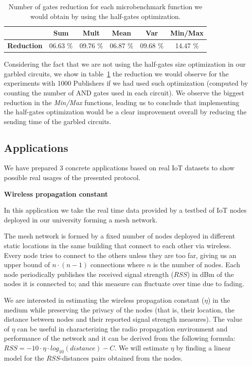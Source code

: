 \begin{table}
    \begin{tabular}{l|*{4}{c}c}
      & \textbf{Sum} & \textbf{Mult} & \textbf{Mean} & \textbf{Var} & \textbf{Min/Max} \\
    \hline
    \textbf{Reduction} & 06.63 \% & 09.76 \% & 06.87 \% & 09.68 \% & 14.47 \% \\
    \end{tabular}
    \caption{Number of gates reduction for each microbenchmark function we
      would obtain by using the half-gates optimization.}
    \label{micro-and}
\end{table}

Considering the fact that we are not using the half-gates size optimization in
our garbled circuits, we show in table~\ref{micro-and} the reduction we would
observe for the experiments with 1000 Publishers if we had used such
optimization (computed by counting the number of AND gates used in each
circuit).  We observe the biggest reduction in the \emph{Min/Max} functions,
leading us to conclude that implementing the half-gates optimization would be a
clear improvement overall by reducing the sending time of the garbled circuits.

\subsection{Applications}

We have prepared 3 concrete applications based on real IoT datasets to show
possible real usages of the presented protocol.

\bigskip
\noindent\textbf{Wireless propagation constant}

In this application we take the real time data provided by a testbed of IoT
nodes deployed in our university forming a mesh network.

The mesh network is formed by a fixed number of nodes deployed in different
static locations in the same building that connect to each other via wireless.
Every node tries to connect to the others unless they are too far, giving us an
upper bound of $n \cdot (n-1)$ connections where $n$ is the number of nodes.
Each node periodically publishes the received signal strength ($RSS$) in dBm of
the nodes it is connected to; and this measure can fluctuate over time due to
fading.

We are interested in estimating the wireless propagation constant ($\eta$) in
the medium while preserving the privacy of the nodes (that is, their location,
the distance between nodes and their reported signal strength measures).
The value of $\eta$ can be useful in characterizing the radio propagation
environment and performance of the network and it can be derived from the
following formula: \mbox{$RSS = -10 \cdot \eta \cdot log_{10}(distance) - C$}.
We will estimate $\eta$ by finding a linear model for the $RSS$-distances pairs
obtained from the nodes.

